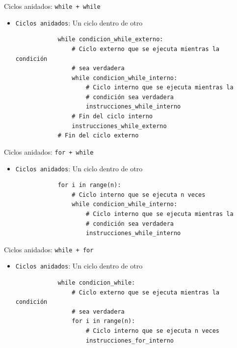 \documentclass{beamer}
\begin{document}
    \begin{frame}[fragile, t]{Ciclos anidados: \texttt{while + while}}
        \begin{itemize}
            \item \texttt{Ciclos anidados}: Un ciclo dentro de otro
            \begin{verbatim}
            while condicion_while_externo:
                # Ciclo externo que se ejecuta mientras la condición 
                # sea verdadera
                while condicion_while_interno:
                    # Ciclo interno que se ejecuta mientras la 
                    # condición sea verdadera
                    instrucciones_while_interno
                # Fin del ciclo interno
                instrucciones_while_externo
            # Fin del ciclo externo
            \end{verbatim}
        \end{itemize}
    \end{frame}

    \begin{frame}[fragile, t]{Ciclos anidados: \texttt{for + while}}
        \begin{itemize}
            \item \texttt{Ciclos anidados}: Un ciclo dentro de otro
            \begin{verbatim}
            for i in range(n):
                # Ciclo interno que se ejecuta n veces
                while condicion_while_interno:
                    # Ciclo interno que se ejecuta mientras la 
                    # condición sea verdadera
                    instrucciones_while_interno
            \end{verbatim}
        \end{itemize}
    \end{frame}

    \begin{frame}[fragile, t]{Ciclos anidados: \texttt{while + for}}
        \begin{itemize}
            \item \texttt{Ciclos anidados}: Un ciclo dentro de otro
            \begin{verbatim}
            while condicion_while:
                # Ciclo externo que se ejecuta mientras la condición 
                # sea verdadera
                for i in range(n):
                    # Ciclo interno que se ejecuta n veces
                    instrucciones_for_interno
            \end{verbatim}
        \end{itemize}
    \end{frame}
\end{document}
